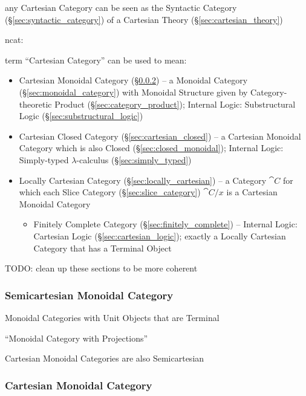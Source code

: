 any Cartesian Category can be seen as the Syntactic Category
(\S\ref{sec:syntactic_category}) of a Cartesian Theory
(\S\ref{sec:cartesian_theory})

ncat:

term ``Cartesian Category'' can be used to mean:
\begin{itemize}
  \item Cartesian Monoidal Category (\S\ref{sec:cartesian_monoidal}) --
    a Monoidal Category (\S\ref{sec:monoidal_category}) with Monoidal Structure
    given by Category-theoretic Product (\S\ref{sec:category_product});
    Internal Logic: Substructural Logic (\S\ref{sec:substructural_logic})
  \item Cartesian Closed Category (\S\ref{sec:cartesian_closed}) -- a Cartesian
    Monoidal Category which is also Closed
    (\S\ref{sec:closed_monoidal});
    Internal Logic: Simply-typed $\lambda$-calculus (\S\ref{sec:simply_typed})
  \item Locally Cartesian Category (\S\ref{sec:locally_cartesian}) -- a
    Category $\cat{C}$ for which each Slice Category
    (\S\ref{sec:slice_category}) $\cat{C} / x$ is a Cartesian Monoidal Category
  \begin{itemize}
    \item Finitely Complete Category (\S\ref{sec:finitely_complete}) --
      Internal Logic: Cartesian Logic (\S\ref{sec:cartesian_logic}); exactly a
      Locally Cartesian Category that has a Terminal Object
  \end{itemize}
\end{itemize}
TODO: clean up these sections to be more coherent



\subsubsection{Semicartesian Monoidal Category}
\label{sec:semicartesian_monoidal}

Monoidal Categories with Unit Objects that are Terminal

``Monoidal Category with Projections''

Cartesian Monoidal Categories are also Semicartesian



\subsubsection{Cartesian Monoidal Category}\label{sec:cartesian_monoidal}

